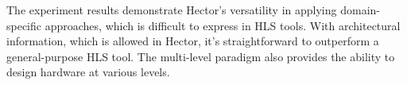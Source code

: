 The experiment results demonstrate Hector's versatility in applying domain-specific approaches, which is difficult to express in HLS tools. With architectural information, which is allowed in Hector, it's straightforward to outperform a general-purpose HLS tool. The multi-level paradigm also provides the ability to design hardware at various levels.
